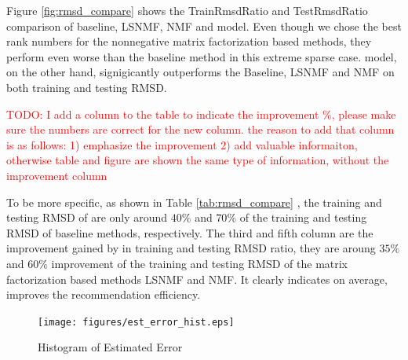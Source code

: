 Figure \ref{fig:rmsd_compare} shows the TrainRmsdRatio and
TestRmsdRatio comparison of baseline, LSNMF, NMF and {\sppan}
model. Even though we chose the best rank numbers for the nonnegative
matrix factorization based methods, they perform even worse than the
baseline method in this extreme sparse case. {\sppan} model, on the
other hand, signigicantly outperforms the Baseline, LSNMF and NMF on
both training and testing RMSD.

\textcolor{red}{TODO: I add a column to the table to indicate the
  improvement \%, please make sure the numbers are correct for the new
  column.  the reason to add that column is as follows: 1) emphasize
  the improvement 2) add valuable informaiton, otherwise table and
  figure are shown the same type of information, without the
  improvement column}

To be more specific, as shown in Table \ref{tab:rmsd_compare} , the
training and testing RMSD of {\sppan} are only around $40\%$ and
$70\%$ of the training and testing RMSD of baseline methods,
respectively. The third and fifth column are the improvement gained by
{\sppan} in training and testing RMSD ratio, they are aroung $35\%$
and $60\%$ improvement of the training and testing RMSD of the matrix
factorization based methods LSNMF and NMF.  It clearly indicates on
average, {\sppan} improves the recommendation efficiency.

\begin{figure}[!ht]
  \centering
  \texttt{[image: figures/est\_error\_hist.eps]}
  \caption{Histogram of Estimated Error}
  \label{fig:est_err}
\end{figure}

